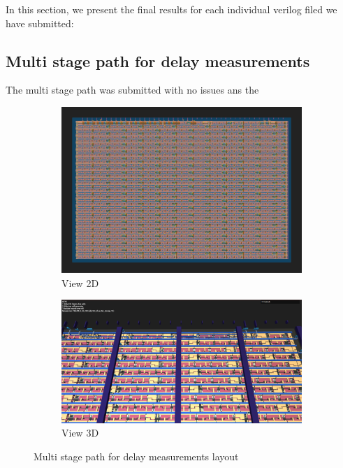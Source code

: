 In this section, we present the final results for each individual verilog filed we have submitted:

\subsection{Multi stage path for delay measurements}
The multi stage path was submitted with no issues ans the
\begin{figure}[H]
    \centering
    \begin{subfigure}[b]{0.45\textwidth}
        \includegraphics[width=\linewidth]{Pictures/Result_Delay_2D_View.png}
        \caption{View 2D}\label{fig:PWM_2D}
    \end{subfigure}
    \begin{subfigure}[b]{0.45\textwidth}
        \includegraphics[width=\linewidth]{Pictures/Result_Delay_3D_View.png}
        \caption{View 3D}\label{fig:PWM_3D}
    \end{subfigure}
    \caption{Multi stage path for delay measurements layout}\label{fig:PWM}
\end{figure}



